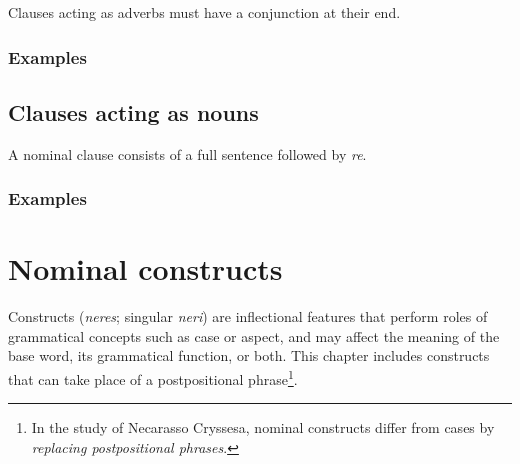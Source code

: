 \documentclass{book}
\begin{document}
Clauses acting as adverbs must have a conjunction at their end.

\subsection{Examples}


\section{Clauses acting as nouns}

A nominal clause consists of a full sentence followed by \emph{re}.

\subsection{Examples}


\chapter{Nominal constructs}

Constructs (\emph{neres}; singular \emph{neri}) are inflectional features that perform roles of grammatical concepts such as case or aspect, and may affect the meaning of the base word, its grammatical function, or both. This chapter includes constructs that can take place of a postpositional phrase\footnote{In the study of Necarasso Cryssesa, nominal constructs differ from cases by \emph{replacing postpositional phrases}.}.
\end{document}
